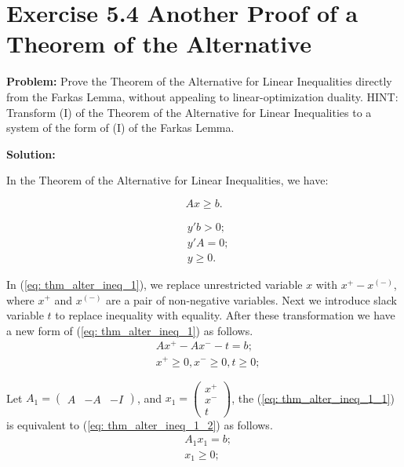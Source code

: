 \section{Exercise 5.4 Another Proof of a Theorem of the Alternative}
\textbf{Problem:} Prove the Theorem of the Alternative for Linear Inequalities directly from the Farkas Lemma, without appealing to linear-optimization duality. HINT: Transform (I) of the Theorem of the Alternative for Linear Inequalities to a system of the form of (I) of the Farkas Lemma.

\textbf{Solution:}

In the Theorem of the Alternative for Linear Inequalities, we have:

\begin{equation}
\label{eq: thm_alter_ineq_1}
Ax \geq b.
\end{equation}

\begin{equation}
\label{eq: thm_alter_ineq_2}
 \begin{array}{lrcll}
    & y'b >0;\\
    & y'A=0;\\
    & y\geq0.
  \end{array}
\end{equation}

In (\ref{eq: thm_alter_ineq_1}), we replace unrestricted variable $x$ with $x^{+}-x^(-)$, where  $x^{+}$ and $x^(-)$ are a pair of non-negative variables. Next we introduce slack variable $t$ to replace inequality with equality. After these transformation we have a new form of (\ref{eq: thm_alter_ineq_1}) as follows.
\begin{equation}
\label{eq: thm_alter_ineq_1_1}
 \begin{array}{lrcll}
    & Ax^{+}-Ax^{-}-t=b;\\
    & x^{+}\geq0, x^{-}\geq0, t \geq0;
  \end{array}
\end{equation}

Let $A_1=\left( \begin{array}{ccc} A & -A & -I \end{array}\right)$, and $x_1=\left( \begin{array}{c} x^{+}\\ x^{-}\\ t \end{array}\right)$, the (\ref{eq: thm_alter_ineq_1_1}) is equivalent to (\ref{eq: thm_alter_ineq_1_2}) as follows.
\begin{equation}
\label{eq: thm_alter_ineq_1_2}
 \begin{array}{lrcll}
    & A_1x_1=b;\\
    & x_1 \geq0;
  \end{array}
\end{equation}

